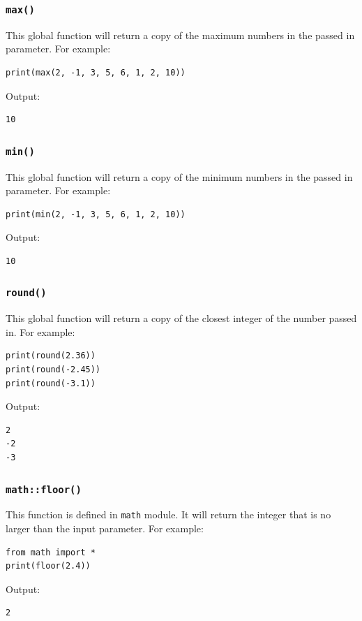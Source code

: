 \documentclass[12pt]{book}
\begin{document}
\subsubsection{\texttt{max()}}
\label{sec:orgc3ca2b2}
This global function will return a copy of the maximum numbers in the passed in parameter. For example:
\begin{verbatim}
print(max(2, -1, 3, 5, 6, 1, 2, 10))
\end{verbatim}
Output:
\begin{verbatim}
10
\end{verbatim}

\subsubsection{\texttt{min()}}
\label{sec:org622b7c8}
This global function will return a copy of the minimum numbers in the passed in parameter. For example:
\begin{verbatim}
print(min(2, -1, 3, 5, 6, 1, 2, 10))
\end{verbatim}
Output:
\begin{verbatim}
10
\end{verbatim}

\subsubsection{\texttt{round()}}
\label{sec:org6a15748}
This global function will return a copy of the closest integer of the number passed in. For example:
\begin{verbatim}
print(round(2.36))
print(round(-2.45))
print(round(-3.1))
\end{verbatim}
Output:
\begin{verbatim}
2
-2
-3
\end{verbatim}

\subsubsection{\texttt{math::floor()}}
\label{sec:org67f30b1}
This function is defined in \texttt{math} module. It will return the integer that is no larger than the input parameter. For example:
\begin{verbatim}
from math import *
print(floor(2.4))
\end{verbatim}
Output:
\begin{verbatim}
2
\end{verbatim}
\end{document}
